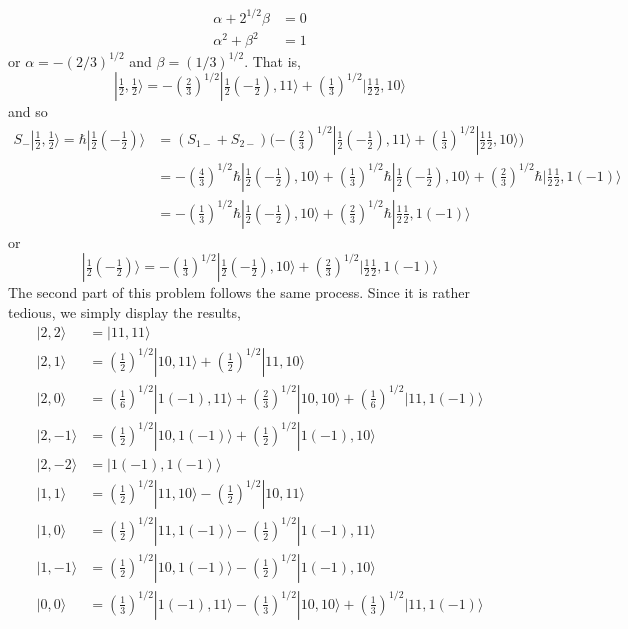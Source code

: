 \documentclass[../principles-of-quantum-mechanics.tex]{subfiles}
\begin{document}
\begin{questions}
\begin{solution}
			\begin{align*}
				\alpha + 2^{1/2}\beta &= 0 \\
				\alpha^2 + \beta^2 &= 1
			\end{align*}
			or $\alpha = -(2/3)^{1/2}$ and $\beta = (1/3)^{1/2}$. That is,
			$$|\tfrac{1}{2},\tfrac{1}{2}\rangle = -(\tfrac{2}{3})^{1/2}|\tfrac{1}{2}(-\tfrac{1}{2}), 11\rangle + (\tfrac{1}{3})^{1/2}|\tfrac{1}{2}\tfrac{1}{2}, 10\rangle$$
			and so
			\begin{align*}
				S_-|\tfrac{1}{2},\tfrac{1}{2}\rangle = \hbar|\tfrac{1}{2}(-\tfrac{1}{2})\rangle &= (S_{1-} + S_{2-})\Big({-(\tfrac{2}{3})^{1/2}}|\tfrac{1}{2}(-\tfrac{1}{2}), 11\rangle + (\tfrac{1}{3})^{1/2}|\tfrac{1}{2}\tfrac{1}{2}, 10\rangle\Big) \\
				&= -(\tfrac{4}{3})^{1/2}\hbar|\tfrac{1}{2}(-\tfrac{1}{2}),10\rangle + (\tfrac{1}{3})^{1/2}\hbar|\tfrac{1}{2}(-\tfrac{1}{2}),10\rangle + (\tfrac{2}{3})^{1/2}\hbar|\tfrac{1}{2}\tfrac{1}{2},1(-1)\rangle \\
				&= -(\tfrac{1}{3})^{1/2}\hbar |\tfrac{1}{2}(-\tfrac{1}{2}),10\rangle + (\tfrac{2}{3})^{1/2}\hbar|\tfrac{1}{2}\tfrac{1}{2},1(-1)\rangle
			\end{align*}
			or
			$$|\tfrac{1}{2}(-\tfrac{1}{2})\rangle = -(\tfrac{1}{3})^{1/2} |\tfrac{1}{2}(-\tfrac{1}{2}),10\rangle + (\tfrac{2}{3})^{1/2}|\tfrac{1}{2}\tfrac{1}{2},1(-1)\rangle$$
			The second part of this problem follows the same process. Since it is rather tedious, we simply display the results,
			\begin{align*}
				|2, 2\rangle &= |11,11\rangle \\
				|2, 1\rangle &= (\tfrac{1}{2})^{1/2}|10,11\rangle + (\tfrac{1}{2})^{1/2}|11, 10\rangle \\
				|2, 0\rangle &= (\tfrac{1}{6})^{1/2}|1(-1),11\rangle + (\tfrac{2}{3})^{1/2}|10,10\rangle + (\tfrac{1}{6})^{1/2}|11, 1(-1)\rangle \\
				|2, {-1}\rangle &= (\tfrac{1}{2})^{1/2}|10,1(-1)\rangle + (\tfrac{1}{2})^{1/2}|1(-1),10\rangle \\
				|2, {-2}\rangle &= |1(-1),1(-1)\rangle \\
				|1, 1\rangle &= (\tfrac{1}{2})^{1/2}|11, 10\rangle - (\tfrac{1}{2})^{1/2}|10, 11\rangle \\
				|1, 0\rangle &= (\tfrac{1}{2})^{1/2}|11, 1(-1)\rangle - (\tfrac{1}{2})^{1/2}|1(-1), 11\rangle \\
				|1, {-1}\rangle &= (\tfrac{1}{2})^{1/2}|10, 1(-1)\rangle - (\tfrac{1}{2})^{1/2}|1(-1), 10\rangle \\
				|0, 0\rangle &= (\tfrac{1}{3})^{1/2}|1(-1), 11\rangle - (\tfrac{1}{3})^{1/2}|10, 10\rangle + (\tfrac{1}{3})^{1/2}|11, 1(-1)\rangle
			\end{align*}
		\end{solution}
		

\end{questions}
\end{document}
